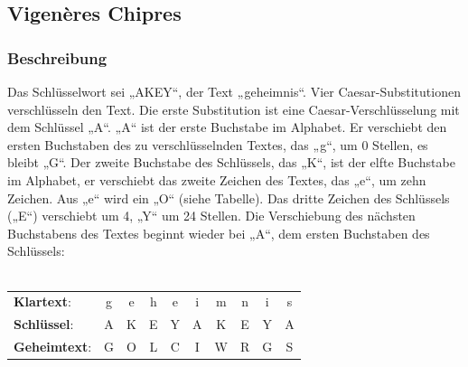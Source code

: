 \documentclass[landscape,twocolumn,a4paper]{article}
\begin{document}
\subsection{Vigenères Chipres}
\subsubsection{Beschreibung}
Das Schlüsselwort sei „AKEY“, der Text „geheimnis“. Vier Caesar-Substitutionen verschlüsseln den Text. Die erste Substitution ist eine Caesar-Verschlüsselung mit dem Schlüssel „A“. „A“ ist der erste Buchstabe im Alphabet. Er verschiebt den ersten Buchstaben des zu verschlüsselnden Textes, das „g“, um 0 Stellen, es bleibt „G“. Der zweite Buchstabe des Schlüssels, das „K“, ist der elfte Buchstabe im Alphabet, er verschiebt das zweite Zeichen des Textes, das „e“, um zehn Zeichen. Aus „e“ wird ein „O“ (siehe Tabelle). Das dritte Zeichen des Schlüssels („E“) verschiebt um 4, „Y“ um 24 Stellen. Die Verschiebung des nächsten Buchstabens des Textes beginnt wieder bei „A“, dem ersten Buchstaben des Schlüssels: \\ \\
\begin{tabular}{l c c c c c c c c c }
	\textbf{Klartext}: & g & e & h & e & i & m & n & i & s \\
	\textbf{Schlüssel}: & A & K & E & Y & A & K & E & Y & A \\
	\textbf{Geheimtext}: & G & O & L & C & I & W & R & G & S 
\end{tabular}
\end{document}
